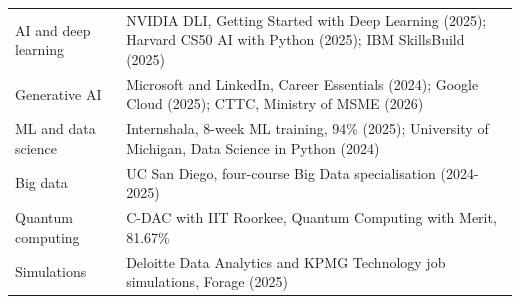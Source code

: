 
\vspace{2pt}
\begin{tabularx}{\textwidth}{LX}
AI and deep learning & NVIDIA DLI, Getting Started with Deep Learning (2025); Harvard CS50 AI with Python (2025); IBM SkillsBuild (2025) \\
Generative AI & Microsoft and LinkedIn, Career Essentials (2024); Google Cloud (2025); CTTC, Ministry of MSME (2026) \\
ML and data science & Internshala, 8-week ML training, 94\% (2025); University of Michigan, Data Science in Python (2024) \\
Big data & UC San Diego, four-course Big Data specialisation (2024-2025) \\
Quantum computing & C-DAC with IIT Roorkee, Quantum Computing with Merit, 81.67\% \\
Simulations & Deloitte Data Analytics and KPMG Technology job simulations, Forage (2025) \\
\end{tabularx}
